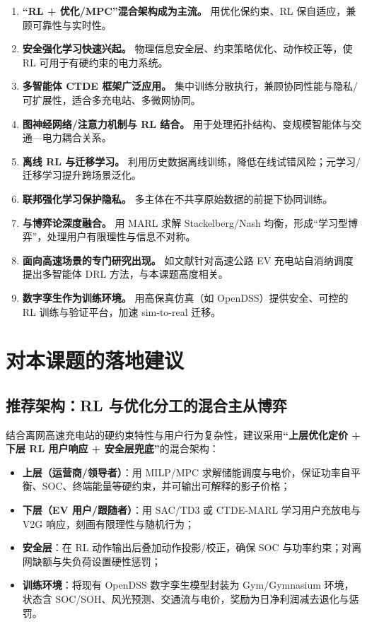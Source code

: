 \documentclass[UTF8,a4paper,11pt]{ctexart}
\begin{document}
\begin{enumerate}
  \item \textbf{“RL + 优化/MPC”混合架构成为主流。} 用优化保约束、RL 保自适应，兼顾可靠性与实时性\cite{ref7,ref8}。
  \item \textbf{安全强化学习快速兴起。} 物理信息安全层、约束策略优化、动作校正等，使 RL 可用于有硬约束的电力系统\cite{ref8,ref9}。
  \item \textbf{多智能体 CTDE 框架广泛应用。} 集中训练分散执行，兼顾协同性能与隐私/可扩展性，适合多充电站、多微网协同\cite{ref6,ref20,ref21}。
  \item \textbf{图神经网络/注意力机制与 RL 结合。} 用于处理拓扑结构、变规模智能体与交通—电力耦合关系。
  \item \textbf{离线 RL 与迁移学习。} 利用历史数据离线训练，降低在线试错风险；元学习/迁移学习提升跨场景泛化。
  \item \textbf{联邦强化学习保护隐私。} 多主体在不共享原始数据的前提下协同训练\cite{ref18,ref19}。
  \item \textbf{与博弈论深度融合。} 用 MARL 求解 Stackelberg/Nash 均衡，形成“学习型博弈”，处理用户有限理性与信息不对称\cite{ref13,ref22}。
  \item \textbf{面向高速场景的专门研究出现。} 如文献\cite{ref2}针对高速公路 EV 充电站自消纳调度提出多智能体 DRL 方法，与本课题高度相关。
  \item \textbf{数字孪生作为训练环境。} 用高保真仿真（如 OpenDSS）提供安全、可控的 RL 训练与验证平台，加速 sim-to-real 迁移。
\end{enumerate}

\section{对本课题的落地建议}

\subsection{推荐架构：RL 与优化分工的混合主从博弈}
结合离网高速充电站的硬约束特性与用户行为复杂性，建议采用\textbf{“上层优化定价 + 下层 RL 用户响应 + 安全层兜底”}的混合架构：
\begin{itemize}
  \item \textbf{上层（运营商/领导者）}：用 MILP/MPC 求解储能调度与电价，保证功率自平衡、SOC、终端能量等硬约束，并可输出可解释的影子价格；
  \item \textbf{下层（EV 用户/跟随者）}：用 SAC/TD3 或 CTDE-MARL 学习用户充放电与 V2G 响应，刻画有限理性与随机行为；
  \item \textbf{安全层}：在 RL 动作输出后叠加动作投影/校正，确保 SOC 与功率约束；对离网缺额与失负荷设置硬性惩罚；
  \item \textbf{训练环境}：将现有 OpenDSS 数字孪生模型封装为 Gym/Gymnasium 环境，状态含 SOC/SOH、风光预测、交通流与电价，奖励为日净利润减去退化与惩罚。
\end{itemize}
\end{document}
